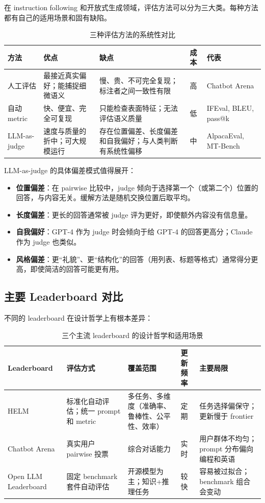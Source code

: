 在 instruction following 和开放式生成领域，评估方法可以分为三大类。每种方法都有自己的适用场景和固有缺陷。

\begin{table}[H]
\centering
\small
\begin{tabular}{p{2.4cm}p{3.0cm}p{3.0cm}p{2.4cm}p{2.4cm}}
\toprule
\textbf{方法} & \textbf{优点} & \textbf{缺点} & \textbf{成本} & \textbf{代表} \\
\midrule
人工评估 & 最接近真实偏好；能捕捉细微语义 & 慢、贵、不可完全复现；标注者之间一致性有限 & 高 & Chatbot Arena \\
\midrule
自动 metric & 快、便宜、完全可复现 & 只能检查表面特征；无法评估语义质量 & 低 & IFEval, BLEU, pass@k \\
\midrule
LLM-as-judge & 速度与质量的折中；可大规模运行 & 存在位置偏差、长度偏差和自我偏好；与人类判断有系统性偏移 & 中 & AlpacaEval, MT-Bench \\
\bottomrule
\end{tabular}
\caption{三种评估方法的系统性对比}
\end{table}

LLM-as-judge 的具体偏差模式值得展开：
\begin{itemize}
    \item \textbf{位置偏差}：在 pairwise 比较中，judge 倾向于选择第一个（或第二个）位置的回答，与内容无关。缓解方法是随机交换位置后取平均。
    \item \textbf{长度偏差}：更长的回答通常被 judge 评为更好，即使额外内容没有信息量。
    \item \textbf{自我偏好}：GPT-4 作为 judge 时会倾向于给 GPT-4 的回答更高分；Claude 作为 judge 也类似。
    \item \textbf{风格偏差}：更``礼貌''、更``结构化''的回答（用列表、标题等格式）通常得分更高，即使简洁的回答可能更有用。
\end{itemize}

\subsection{主要 Leaderboard 对比}

不同的 leaderboard 在设计哲学上有根本差异：

\begin{table}[H]
\centering
\small
\begin{tabular}{p{2.5cm}p{2.8cm}p{2.8cm}p{2.5cm}p{2.5cm}}
\toprule
\textbf{Leaderboard} & \textbf{评估方式} & \textbf{覆盖范围} & \textbf{更新频率} & \textbf{主要局限} \\
\midrule
HELM & 标准化自动评估；统一 prompt 和 metric & 多任务、多维度（准确率、鲁棒性、公平性、效率） & 定期 & 任务选择偏保守；更新慢于 frontier \\
\midrule
Chatbot Arena & 真实用户 pairwise 投票 & 综合对话能力 & 实时 & 用户群体不均匀；prompt 分布偏向编程和英语 \\
\midrule
Open LLM Leaderboard & 固定 benchmark 套件自动评估 & 开源模型为主；知识+推理任务 & 较快 & 容易被过拟合；benchmark 组合会变动 \\
\bottomrule
\end{tabular}
\caption{三个主流 leaderboard 的设计哲学和适用场景}
\end{table}

